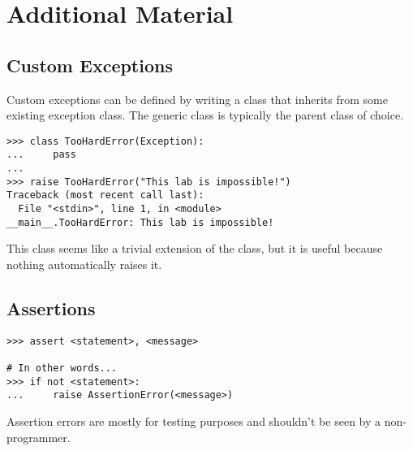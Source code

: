 \newpage

\section*{Additional Material} %

\subsection*{Custom Exceptions}

Custom exceptions can be defined by writing a class that inherits from some existing exception class.
The generic  class is typically the parent class of choice.

\begin{lstlisting}
>>> class TooHardError(Exception):
...     pass
... 
>>> raise TooHardError("This lab is impossible!")
Traceback (most recent call last):
  File "<stdin>", line 1, in <module>
__main__.TooHardError: This lab is impossible!
\end{lstlisting}

This class seems like a trivial extension of the  class, but it is useful because nothing automatically raises it.

\subsection*{Assertions} %

\begin{lstlisting}
>>> assert <statement>, <message>

# In other words...
>>> if not <statement>:
...     raise AssertionError(<message>)
\end{lstlisting}

Assertion errors are mostly for testing purposes and shouldn't be seen by a non-programmer.

\begin{comment}
\subsection*{Buffering} %
Details about file.flush(), the buffer argument for open(), and reading large files.
\end{comment}

\begin{comment}
\subsection*{The CSV Module} %

The CSV format (comma separated value) is a common file format for spreadsheets and grid-like data.
The \li{csv} module in the standard library has some methods that work with the \li{file} object to read a CSV file.
This can also be useful for STUFF.
\end{comment}

